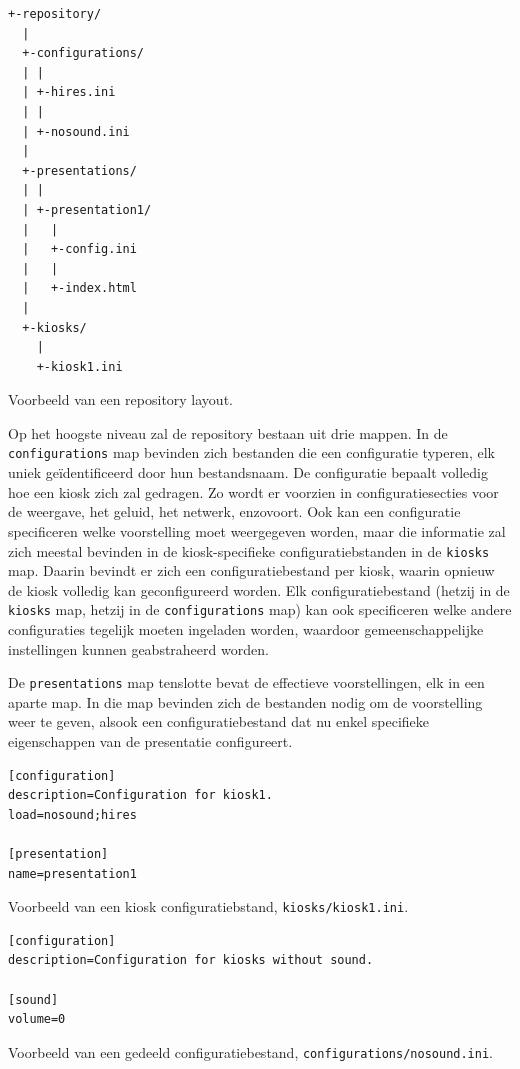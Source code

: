 \begin{code}
\begin{verbatim}
+-repository/
  |
  +-configurations/
  | |
  | +-hires.ini
  | |
  | +-nosound.ini
  |
  +-presentations/
  | |
  | +-presentation1/
  |   |
  |   +-config.ini
  |   |
  |   +-index.html
  |
  +-kiosks/
    |
    +-kiosk1.ini
\end{verbatim}
\caption{Voorbeeld van een repository layout.}
\end{code}

Op het hoogste niveau zal de repository bestaan uit drie mappen. In de \texttt{configurations} map bevinden zich bestanden die een configuratie typeren, elk uniek geïdentificeerd door hun bestandsnaam. De configuratie bepaalt volledig hoe een kiosk zich zal gedragen. Zo wordt er voorzien in configuratiesecties voor de weergave, het geluid, het netwerk, enzovoort. Ook kan een configuratie specificeren welke voorstelling moet weergegeven worden, maar die informatie zal zich meestal bevinden in de kiosk-specifieke configuratiebstanden in de \texttt{kiosks} map. Daarin bevindt er zich een configuratiebestand per kiosk, waarin opnieuw de kiosk volledig kan geconfigureerd worden. Elk configuratiebestand (hetzij in de \texttt{kiosks} map, hetzij in de \texttt{configurations} map) kan ook specificeren welke andere configuraties tegelijk moeten ingeladen worden, waardoor gemeenschappelijke instellingen kunnen geabstraheerd worden.

De \texttt{presentations} map tenslotte bevat de effectieve voorstellingen, elk in een aparte map. In die map bevinden zich de bestanden nodig om de voorstelling weer te geven, alsook een configuratiebestand dat nu enkel specifieke eigenschappen van de presentatie configureert.

\begin{code}
\begin{verbatim}
[configuration]
description=Configuration for kiosk1.
load=nosound;hires

[presentation]
name=presentation1
\end{verbatim}
\caption{Voorbeeld van een kiosk configuratiebstand, \texttt{kiosks/kiosk1.ini}.}
\end{code}

\begin{code}
\begin{verbatim}
[configuration]
description=Configuration for kiosks without sound.

[sound]
volume=0
\end{verbatim}
\caption{Voorbeeld van een gedeeld configuratiebestand, \texttt{configurations/nosound.ini}.}
\end{code}


